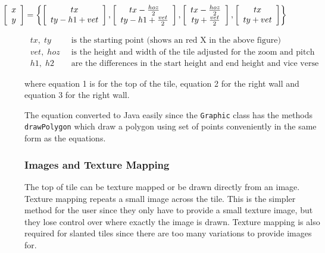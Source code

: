 \begin{equation}
\hspace{-2.5cm} \left[ \begin{array}{c} x \\ y \end{array} \right]=\left\{ \left[ \begin{array}{c} tx \\ ty-h1+vet \end{array} \right],\left[ \begin{array}{c} tx-\frac{hoz}{2} \\ ty-h1+\frac{vet}{2} \end{array} \right],\left[ \begin{array}{c} tx-\frac{hoz}{2} \\ ty+\frac{vet}{2} \end{array} \right],\left[ \begin{array}{c} tx \\ ty+vet \end{array} \right] \right\}
\end{equation}

\begin{align*}
	tx,\; ty   &\;\; \textrm{is the starting point (shows an red X in the above figure)}\\
	vet,\; hoz &\;\; \textrm{is the height and width of the tile adjusted for  the zoom and pitch}\\
	h1,\; h2   &\;\; \textrm{are the differences in the start height and end height and vice verse}
\end{align*}

where equation 1 is for the top of the tile, equation 2 for the right wall and equation 3 for the right wall. 

The equation converted to Java easily since the \texttt{Graphic} class has the methods  \texttt{drawPolygon} which draw a polygon using set of points conveniently in the same form as the equations.

\subsubsection{Images and Texture Mapping}
The top of tile can be texture mapped or be drawn directly from an image.  Texture mapping repeats a small image across the tile. This is the simpler method for the user since they only have to provide a small texture image, but they lose control over where exactly the image is drawn.  Texture mapping is also required for slanted tiles since there are too many variations to provide images for.

